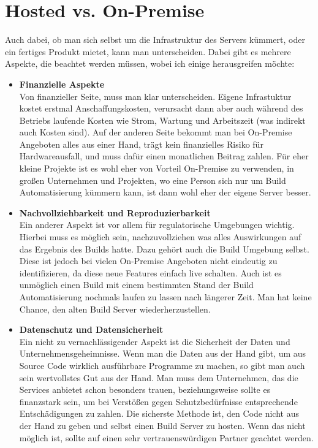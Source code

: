 \section{Hosted vs. On-Premise}
Auch dabei, ob man sich selbst um die Infrastruktur des Servers kümmert, oder ein fertiges Produkt mietet, kann man unterscheiden. Dabei gibt es mehrere Aspekte, die beachtet werden müssen, wobei ich einige herausgreifen möchte:
\begin{itemize}
	\item \textbf{Finanzielle Aspekte}\\
	Von finanzieller Seite, muss man klar unterscheiden. Eigene Infrastuktur kostet erstmal Anschaffungskosten, verursacht dann aber auch während des Betriebs laufende Kosten wie Strom, Wartung und Arbeitszeit (was indirekt auch Kosten sind). Auf der anderen Seite bekommt man bei On-Premise Angeboten alles aus einer Hand, trägt kein finanzielles Risiko für Hardwareausfall, und muss dafür einen monatlichen Beitrag zahlen. Für eher kleine Projekte ist es wohl eher von Vorteil On-Premise zu verwenden, in großen Unternehmen und Projekten, wo eine Person sich nur um Build Automatisierung kümmern kann, ist dann wohl eher der eigene Server besser.
	\item \textbf{Nachvollziehbarkeit und Reproduzierbarkeit}\\
	Ein anderer Aspekt ist vor allem für regulatorische Umgebungen wichtig. Hierbei muss es möglich sein, nachzuvollziehen was alles Auswirkungen auf das Ergebnis des Builds hatte. Dazu gehört auch die Build Umgebung selbst. Diese ist jedoch bei vielen On-Premise Angeboten nicht eindeutig zu identifizieren, da diese neue Features einfach live schalten. Auch ist es unmöglich einen Build mit einem bestimmten Stand der Build Automatisierung nochmals laufen zu lassen nach längerer Zeit. Man hat keine Chance, den alten Build Server wiederherzustellen.
	\item \textbf{Datenschutz und Datensicherheit}\\
	Ein nicht zu vernachlässigender Aspekt ist die Sicherheit der Daten und Unternehmensgeheimnisse. Wenn man die Daten aus der Hand gibt, um aus Source Code wirklich ausführbare Programme zu machen, so gibt man auch sein wertvollstes Gut aus der Hand. Man muss dem Unternehmen, das die Services anbietet schon besonders trauen, beziehungsweise sollte es finanzstark sein, um bei Verstößen gegen Schutzbedürfnisse entsprechende Entschädigungen zu zahlen. Die sicherste Methode ist, den Code nicht aus der Hand zu geben und selbst einen Build Server zu hosten. Wenn das nicht möglich ist, sollte auf einen sehr vertrauenswürdigen Partner geachtet werden.
\end{itemize}

